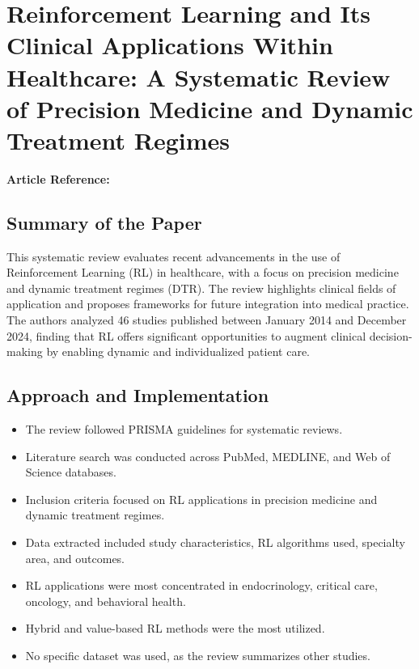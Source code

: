 \section{Reinforcement Learning and Its Clinical Applications Within Healthcare: A Systematic Review of Precision Medicine and Dynamic Treatment Regimes}
\textbf{Article Reference:} \cite{frommeyerReinforcementLearningIts2025}

\subsection*{Summary of the Paper}
This systematic review evaluates recent advancements in the use of Reinforcement Learning (RL) in healthcare, with a focus on precision medicine and dynamic treatment regimes (DTR). The review highlights clinical fields of application and proposes frameworks for future integration into medical practice. The authors analyzed 46 studies published between January 2014 and December 2024, finding that RL offers significant opportunities to augment clinical decision-making by enabling dynamic and individualized patient care.

\subsection*{Approach and Implementation}
\begin{itemize}
    \item The review followed PRISMA guidelines for systematic reviews.
    \item Literature search was conducted across PubMed, MEDLINE, and Web of Science databases.
    \item Inclusion criteria focused on RL applications in precision medicine and dynamic treatment regimes.
    \item Data extracted included study characteristics, RL algorithms used, specialty area, and outcomes.
    \item RL applications were most concentrated in endocrinology, critical care, oncology, and behavioral health.
    \item Hybrid and value-based RL methods were the most utilized.
    \item No specific dataset was used, as the review summarizes other studies.
\end{itemize}

